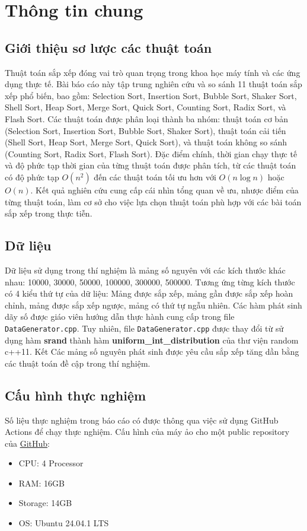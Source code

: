 \section{Thông tin chung}

\subsection{Giới thiệu sơ lược các thuật toán}

Thuật toán sắp xếp đóng vai trò quan trọng trong khoa học máy tính và các ứng dụng thực tế. Bài báo cáo này tập trung nghiên cứu và so sánh 11 thuật toán sắp xếp phổ biến, bao gồm: Selection Sort, Insertion Sort, Bubble Sort, Shaker Sort, Shell Sort, Heap Sort, Merge Sort, Quick Sort, Counting Sort, Radix Sort, và Flash Sort. Các thuật toán được phân loại thành ba nhóm: thuật toán cơ bản (Selection Sort, Insertion Sort, Bubble Sort, Shaker Sort), thuật toán cải tiến (Shell Sort, Heap Sort, Merge Sort, Quick Sort), và thuật toán không so sánh (Counting Sort, Radix Sort, Flash Sort). Đặc điểm chính, thời gian chạy thực tế và độ phức tạp thời gian của từng thuật toán được phân tích, từ các thuật toán có độ phức tạp $O(n^2)$ đến các thuật toán tối ưu hơn với $O(n \log n)$ hoặc $O(n)$. Kết quả nghiên cứu cung cấp cái nhìn tổng quan về ưu, nhược điểm của từng thuật toán, làm cơ sở cho việc lựa chọn thuật toán phù hợp với các bài toán sắp xếp trong thực tiễn.

\subsection{Dữ liệu}

Dữ liệu sử dụng trong thí nghiệm là mảng số nguyên với các kích thước khác nhau: 10000, 30000, 50000, 100000, 300000, 500000. Tương ứng từng kích thước có 4 kiểu thứ tự của dữ liệu: Mảng được sắp xếp, mảng gần được sắp xếp hoàn chỉnh, mảng được sắp xếp ngược, mảng có thứ tự ngẫu nhiên. Các hàm phát sinh dãy số được giáo viên hướng dẫn thực hành cung cấp trong file \texttt{DataGenerator.cpp}. Tuy nhiên, file \texttt{DataGenerator.cpp} được thay đổi từ sử dụng hàm \textbf{srand} thành hàm \textbf{uniform\_int\_distribution} của thư viện random c++11. Kết  Các mảng số nguyên phát sinh được yêu cầu sắp xếp tăng dần bằng các thuật toán đề cập trong thí nghiệm.

\subsection{Cấu hình thực nghiệm}
Số liệu thực nghiệm trong báo cáo có được thông qua việc sử dụng GitHub Actions để chạy thực nghiệm. Cấu hình của máy ảo cho một public repository của \href{https://docs.github.com/en/actions/using-github-hosted-runners/using-github-hosted-runners/about-github-hosted-runners#supported-runners-and-hardware-resources}{GitHub}:
\begin{itemize}
    \item CPU: 4 Processor
    \item RAM: 16GB
    \item Storage: 14GB
    \item OS: Ubuntu 24.04.1 LTS
\end{itemize}
 

 
